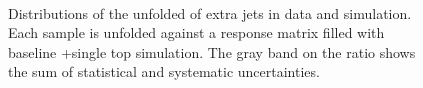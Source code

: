 \begin{figure}
\centering
{}
 \\
\caption{Distributions of the unfolded \pt of extra jets in data and simulation. Each sample is unfolded against a response matrix filled with baseline \ttbar+single top simulation. The gray band on the ratio shows the sum of statistical and systematic uncertainties.}
\label{fig:unfptmllo}
\end{figure}
